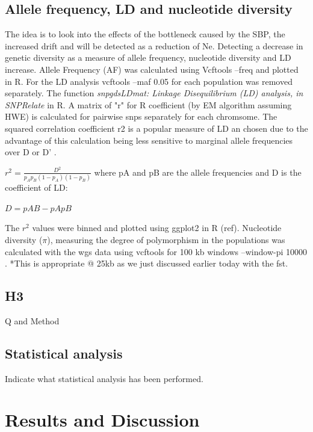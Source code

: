 \documentclass[9pt, onecolumn,twoside]{gsajnl}
\begin{document}
\subsection{Allele frequency, LD and nucleotide diversity}
The idea is to look into the effects of the bottleneck caused by the SBP, the increased drift and will be detected as a reduction of Ne. Detecting a decrease in genetic diversity as a measure of allele frequency, nucleotide diversity and LD increase. Allele Frequency (AF) was calculated using Vcftools --freq and plotted in R. For the LD analysis vcftools --maf 0.05 for each population was removed separately. The function \textit{snpgdsLDmat: Linkage Disequilibrium (LD) analysis, in SNPRelate } in R. A matrix of "r" for R coefficient (by EM algorithm assuming HWE) is calculated for pairwise snps separately for each chromsome. 
The squared correlation coefficient r2 is a popular measure of LD an chosen due to the advantage of this calculation being less sensitive to marginal allele frequencies over  D or D' \cite{sved18}. 

\(r^2 = \frac{D^2}{p_Ap_B(1 - p_A)(1 - p_B)}\) where pA and pB are the allele frequencies and D is the coefficient of LD: 


$D=pAB−pApB$


The $r^2$  values were binned and plotted using ggplot2 \cite{wickham16} in R (ref).  Nucleotide diversity ($\pi$), measuring the degree of polymorphism in the populations was calculated with the wgs data using vcftools for 100 kb windows --window-pi 10000 \cite{nei79}. *This is appropriate @ 25kb as we just discussed earlier today with the fst. 

\subsection{H3}
Q and Method


\subsection{Statistical analysis}

Indicate what statistical analysis has been performed.


\section{Results and Discussion}
\end{document}
